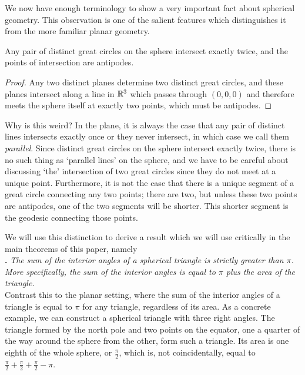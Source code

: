 We now have enough terminology to show a very important fact about spherical geometry.  This  observation is one of the salient features which distinguishes it from the more familiar planar geometry.


\begin{claim}
	Any pair of distinct great circles on the sphere intersect exactly twice, and the points of intersection are antipodes.
\end{claim}
\begin{proof}
	Any two distinct planes determine two distinct great circles, and these planes intersect along a line in $\mathbb{R}^3$ which passes through $(0,0,0)$ and therefore meets the sphere itself at exactly two points, which must be antipodes.
\end{proof}



Why is this weird? In the plane, it is always the case that any pair of distinct lines intersects exactly once or they never intersect, in which case we call them \textit{parallel}. Since distinct great circles on the sphere intersect exactly twice, there is no such thing as `parallel lines' on the sphere, and we have to be careful about discussing `the' intersection of two great circles since they do not meet at a unique point.  Furthermore, it is not the case that there is a unique segment of a great circle connecting any two points; there are two, but unless these two points are antipodes, one of the two segments will be shorter.  This shorter segment is the geodesic connecting those points.



We will use this distinction to derive a result which we will use critically in the main theorems of this paper, namely\\

\noindent\textbf{.}
\emph{The sum of the interior angles of a spherical triangle is strictly greater than $\pi$.  More specifically, the sum of the interior angles is equal to $\pi$ plus the area of the triangle.}\\

Contrast this to the planar setting, where the sum of the interior angles of a triangle is equal to $\pi$ for any triangle, regardless of its area.  As a concrete example, we can construct a spherical triangle with three right angles.  The triangle formed by the north pole and two points on the equator, one a quarter of the way around the sphere from the other, form such a triangle.  Its area is one eighth of the whole sphere, or $\tfrac{\pi}{2}$, which is, not coincidentally, equal to $\tfrac{\pi}{2}+\tfrac{\pi}{2}+\tfrac{\pi}{2} - \pi$.



